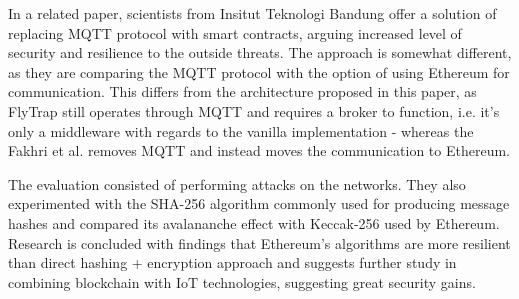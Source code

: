 In a related paper, scientists from Insitut Teknologi Bandung \citep{fakhri2018secure} offer a solution of replacing MQTT protocol with smart contracts, arguing increased level of security and resilience to the outside threats. The approach is somewhat different, as they are comparing the MQTT protocol with the option of using Ethereum for communication. This differs from the architecture proposed in this paper, as FlyTrap still operates through MQTT and requires a broker to function, i.e. it's only a middleware with regards to the vanilla implementation - whereas the Fakhri et al. removes MQTT and instead moves the communication to Ethereum.

The evaluation consisted of performing attacks on the networks. They also experimented with the SHA-256 \cite{gilbert2003security} algorithm commonly used for producing message hashes and compared its avalananche effect with Keccak-256 used by Ethereum. Research is concluded with findings that Ethereum's algorithms are more resilient than direct hashing + encryption approach and suggests further study in combining blockchain with IoT technologies, suggesting great security gains.